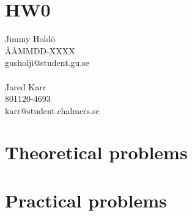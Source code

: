 \documentclass[a4paper,11pt]{article}
\begin{document}
\section*{HW0}
Jimmy Hold\"{o}\\
\AA\AA MMDD-XXXX\\
gusholji@student.gu.se\\ \\
Jared Karr\\
801120-4693\\
karr@student.chalmers.se\\
\section{Theoretical problems}
\subsection{}
\subsection{}

\section{Practical problems}
\subsection{}
\subsection{}
\end{document}
